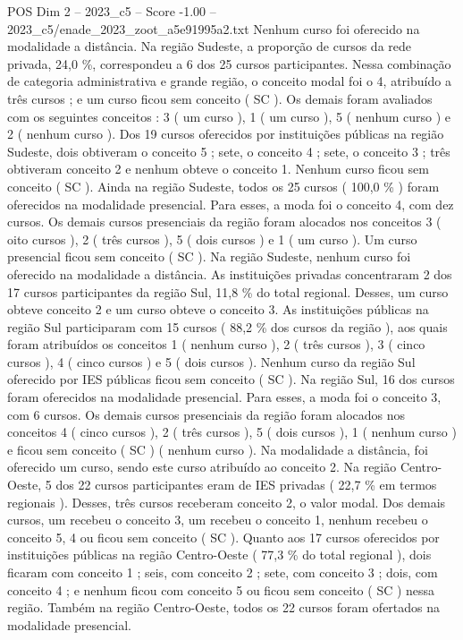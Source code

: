 \begin{textsample}{POS Dim 2 – 2023\_c5 – Score -1.00 – 2023\_c5/enade\_2023\_zoot\_a5e91995a2.txt}
Nenhum curso foi oferecido na modalidade a distância.
Na região Sudeste, a proporção de cursos da rede privada, 24,0 \%, correspondeu a 6 dos 25 cursos participantes.
Nessa combinação de categoria administrativa e grande região, o conceito modal foi o 4, atribuído a três cursos ; e um curso ficou sem conceito ( SC ).
Os demais foram avaliados com os seguintes conceitos : 3 ( um curso ), 1 ( um curso ), 5 ( nenhum curso ) e 2 ( nenhum curso ).
Dos 19 cursos oferecidos por instituições públicas na região Sudeste, dois obtiveram o conceito 5 ; sete, o conceito 4 ; sete, o conceito 3 ; três obtiveram conceito 2 e nenhum obteve o conceito 1.
Nenhum curso ficou sem conceito ( SC ).
Ainda na região Sudeste, todos os 25 cursos ( 100,0 \% ) foram oferecidos na modalidade presencial.
Para esses, a moda foi o conceito 4, com dez cursos.
Os demais cursos presenciais da região foram alocados nos conceitos 3 ( oito cursos ), 2 ( três cursos ), 5 ( dois cursos ) e 1 ( um curso ).
Um curso presencial ficou sem conceito ( SC ).
Na região Sudeste, nenhum curso foi oferecido na modalidade a distância.
As instituições privadas concentraram 2 dos 17 cursos participantes da região Sul, 11,8 \% do total regional.
Desses, um curso obteve conceito 2 e um curso obteve o conceito 3.
As instituições públicas na região Sul participaram com 15 cursos ( 88,2 \% dos cursos da região ), aos quais foram atribuídos os conceitos 1 ( nenhum curso ), 2 ( três cursos ), 3 ( cinco cursos ), 4 ( cinco cursos ) e 5 ( dois cursos ).
Nenhum curso da região Sul oferecido por IES públicas ficou sem conceito ( SC ).
Na região Sul, 16 dos cursos foram oferecidos na modalidade presencial.
Para esses, a moda foi o conceito 3, com 6 cursos.
Os demais cursos presenciais da região foram alocados nos conceitos 4 ( cinco cursos ), 2 ( três cursos ), 5 ( dois cursos ), 1 ( nenhum curso ) e ficou sem conceito ( SC ) ( nenhum curso ).
Na modalidade a distância, foi oferecido um curso, sendo este curso atribuído ao conceito 2.
Na região Centro-Oeste, 5 dos 22 cursos participantes eram de IES privadas ( 22,7 \% em termos regionais ).
Desses, três cursos receberam conceito 2, o valor modal.
Dos demais cursos, um recebeu o conceito 3, um recebeu o conceito 1, nenhum recebeu o conceito 5, 4 ou ficou sem conceito ( SC ).
Quanto aos 17 cursos oferecidos por instituições públicas na região Centro-Oeste ( 77,3 \% do total regional ), dois ficaram com conceito 1 ; seis, com conceito 2 ; sete, com conceito 3 ; dois, com conceito 4 ; e nenhum ficou com conceito 5 ou ficou sem conceito ( SC ) nessa região.
Também na região Centro-Oeste, todos os 22 cursos foram ofertados na modalidade presencial.

\end{textsample}
